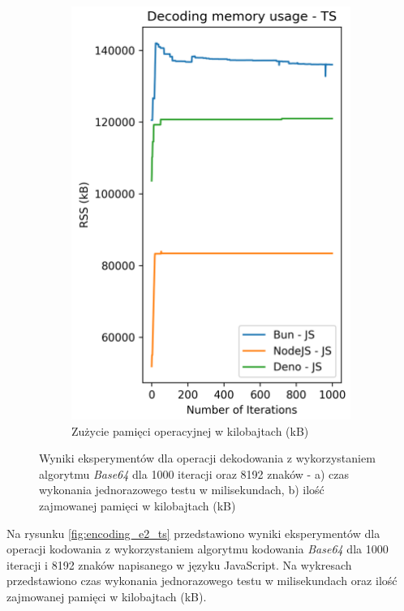 \begin{figure}[H]
\begin{subfigure}[b]{0.42\textwidth}
    \includegraphics[width=\textwidth]{Figures/coding/base64_1000_decoding_js_memory.png}
    \caption{Zużycie pamięci operacyjnej w kilobajtach (kB)}
    \label{fig:decoding_e2_js_memory}
  \end{subfigure}
  \hfill
  \caption{Wyniki eksperymentów dla operacji dekodowania z wykorzystaniem algorytmu \textit{Base64} dla 1000 iteracji oraz 8192 znaków - a) czas wykonania jednorazowego testu w milisekundach, b) ilość zajmowanej pamięci w kilobajtach (kB)}
  \label{fig:decoding_e2_js}
\end{figure}

Na rysunku \ref{fig:encoding_e2_ts} przedstawiono wyniki eksperymentów dla operacji kodowania z wykorzystaniem algorytmu kodowania \textit{Base64} dla 1000 iteracji i 8192 znaków napisanego w języku JavaScript. Na wykresach przedstawiono czas wykonania jednorazowego testu w milisekundach oraz ilość zajmowanej pamięci w kilobajtach (kB).

